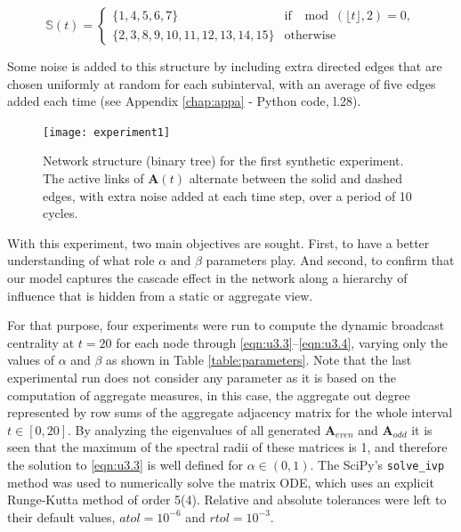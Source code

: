 \[
\mathbb{S}(t) =
    \begin{cases}
        \{ 1,4,5,6,7 \} & \text{if } \mod(\lfloor t \rfloor, 2) = 0, \\
        \{ 2,3,8,9,10,11,12,13,14,15 \} & \text{otherwise} 
    \end{cases}
\]

Some noise is added to this structure by including extra directed edges that are chosen uniformly at random for each subinterval, with an average of five edges added each time (see Appendix \ref{chap:appa} - Python code, l.28).

\begin{figure}[h]\centering
    \texttt{[image: experiment1]}
    \caption{Network structure (binary tree) for the first synthetic experiment. The active links of $\mathbf{A}(t)$ alternate between the solid and dashed edges, with extra noise added at each time step, over a period of 10 cycles.}
    \label{fig:exp1}
    \bigskip
\end{figure}

With this experiment, two main objectives are sought. First, to have a better understanding of what role $\alpha$ and $\beta$ parameters play. And second, to confirm that our model captures the cascade effect in the network along a hierarchy of influence that is hidden from a static or aggregate view.

For that purpose, four experiments were run to compute the dynamic broadcast centrality at $t=20$ for each node through \eqref{eqn:u3.3}--\eqref{eqn:u3.4}, varying only the values of $\alpha$ and $\beta$ as shown in Table \ref{table:parameters}. Note that the last experimental run does not consider any parameter as it is based on the computation of aggregate measures, in this case, the aggregate out degree represented by row sums of the aggregate adjacency matrix for the whole interval $t\in[0,20]$. By analyzing the eigenvalues of all generated $\mathbf{A}_{even}$ and $\mathbf{A}_{odd}$ it is seen that the maximum of the spectral radii of these matrices is 1, and therefore the solution to \eqref{eqn:u3.3} is well defined for $\alpha\in(0,1)$. The SciPy’s \texttt{solve\_ivp} method was used to numerically solve the matrix ODE, which uses an explicit Runge-Kutta method of order 5(4). Relative and absolute tolerances were left to their default values, $atol= 10^{-6}$ and $rtol=10^{-3}$. 

